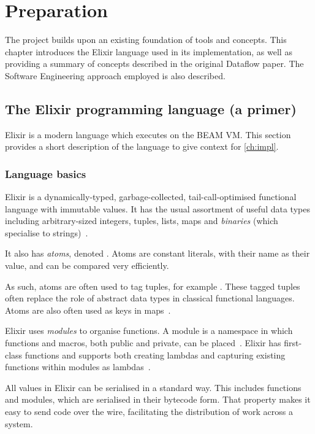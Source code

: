 \chapter{Preparation}\label{ch:prep}

The project builds upon an existing foundation of tools and concepts.
This chapter introduces the Elixir language used in its implementation, as well as providing a summary of concepts described in the original Dataflow paper.
The Software Engineering approach employed is also described.

\section{The Elixir programming language (a primer)}\label{sec:prep:elixir}

Elixir is a modern language which executes on the BEAM VM.
This section provides a short description of the language to give context for \cref{ch:impl}.

\subsection{Language basics}\label{sec:prep:elixir:basics}

Elixir is a dynamically-typed, garbage-collected, tail-call-optimised functional language with immutable values.
It has the usual assortment of useful data types including arbitrary-sized integers, tuples, lists, maps and \emph{binaries} (which specialise to strings)~\cite[p.~23]{Thomas:2016}.

It also has \emph{atoms}, denoted .
Atoms are constant literals, with their name as their value, and can be compared very efficiently.

As such, atoms are often used to tag tuples, for example .
These tagged tuples often replace the role of abstract data types in classical functional languages.
Atoms are also often used as keys in maps~\cite[p.~29]{Thomas:2016}.

Elixir uses \emph{modules} to organise functions.
A module is a namespace in which functions and macros, both public and private, can be placed~\cite[p.~58]{Thomas:2016}.
Elixir has first-class functions and supports both creating lambdas and capturing existing functions within modules as lambdas~\cite[p.~37]{Thomas:2016}.

All values in Elixir can be serialised in a standard way.
This includes functions and modules, which are serialised in their bytecode form.
That property makes it easy to send code over the wire, facilitating the distribution of work across a system.

